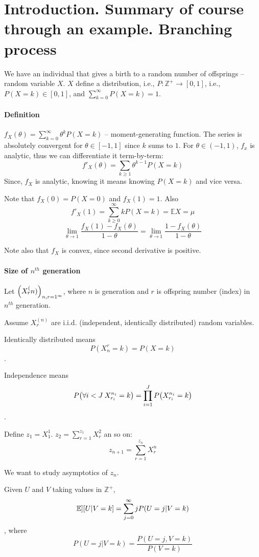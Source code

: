\section{Introduction. Summary of course through an example. Branching process}
We have an individual that gives a birth to a random number of offsprings -- random variable $X$.
$X$ define a distribution, i.e., $P: \mathbb{Z}^+ \to [0,1]$, i.e., $P(X=k) \in [0,1]$, and $\sum_{k=0}^\infty P(X=k)  = 1$.

\paragraph{Definition} $f_X(\theta) = \sum_{k=0}^\infty \theta^k P(X=k)$ -- moment-generating function. The series is absolutely convergent for $\theta\in [-1,1]$ since $k$ sums to $1$. For $\theta \in (-1,1)$, $f_x$ is analytic, thus we can differentiate it term-by-term:
$$f'_X(\theta) = \sum_{k\geq1} \theta^{k-1} P(X=k)$$
Since, $f_X$ is analytic, knowing it means knowing $P(X=k)$ and vice versa.

Note that $f_X(0) = P(X=0)$ and $f_X(1)=1$. Also
$$f'_X(1) = \sum_{k\geq 0 }^\infty k P(X=k) = \mathbb{E} X = \mu$$
$$\lim_{\theta \to 1} \frac{f_X(1)-f_X(\theta)}{1-\theta}=\lim_{\theta \to 1} \frac{1-f_X(\theta)}{1-\theta}$$

Note also that $f_X$ is convex, since second derivative is positive.
\paragraph{Size of $n^{th}$ generation}
Let $\qty(X_r^(n))_{n,r=1^\infty}$, where $n$ is generation and $r$ is offspring number (index) in $n^{th}$ generation.

Assume $X_r^{(n)}$ are i.i.d.  (independent, identically distributed) random variables.

Identically distributed means $$P(X_n^r = k) = P(X=k)$$.

Independence means $$P\qty(\forall i<J \: X_{r_i}^{n_i} =k) = \prod_{i=1}^J P\qty( X_{r_i}^{n_i} =k)$$.

Define $z_1=X_1^1$. $z_2 = \sum_{r=1}^{z_1} X_r^2$ an so on:
$$z_{n+1} = \sum_{r=1}^{z_n} X_{r}^{n}$$

We want to study asymptotics of $z_n$.

Given $U$ and $V$ taking values in $ \mathbb{Z}^+$,
$$\mathbb{E}] \qty[ U|V=k] = \sum_{j=0}^\infty j P(U=j | V=k)$$, where $$P(U=j|V=k) = \frac{P(U=j, V=k)}{P(V=k)}$$

